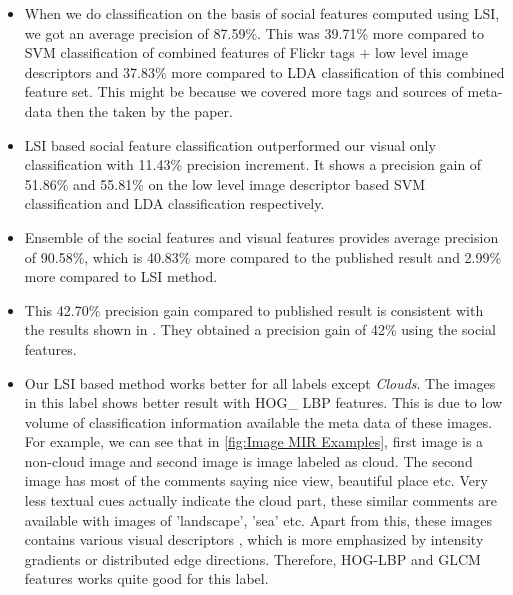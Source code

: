 \begin{itemize}

\item When we do classification on the basis of social features computed using LSI, we got an average precision of 87.59\%. This was
39.71\% more compared to SVM classification of combined features of Flickr tags $+$ low level image descriptors and  37.83\% more
compared to LDA classification of this combined feature set. This might be because we covered more tags and sources of meta-data then the taken by the paper.
\item LSI based social feature classification outperformed our visual only classification with 11.43\% precision increment.  It shows a
precision gain of 51.86\% and 55.81\% on the low level image descriptor based SVM classification and LDA classification respectively.
\item Ensemble of the social features and visual features provides average precision of 90.58\%, which is 40.83\% more compared to the published result and 2.99\% more compared to LSI method.
\item This 42.70\% precision gain compared to published result is consistent with the results shown in \citet{Jure}. They obtained a
precision gain of 42\% using the social features.
\item Our LSI based method works better for all labels except \textit{Clouds}. The images in this label shows better result with HOG\_ LBP features. This is due to low volume of classification information available the meta data of these images. For example, we can see that in \ref{fig:Image MIR Examples}, first image is a non-cloud image and second image is image labeled as cloud. The second image has most of the comments saying nice view, beautiful place etc. Very less textual cues actually indicate the cloud part, these similar comments are available with images of 'landscape', 'sea' etc. Apart from this, these images contains various visual descriptors , which is more emphasized by intensity gradients or distributed edge directions. Therefore, HOG-LBP and GLCM features works quite good for this label.

\end{itemize}
